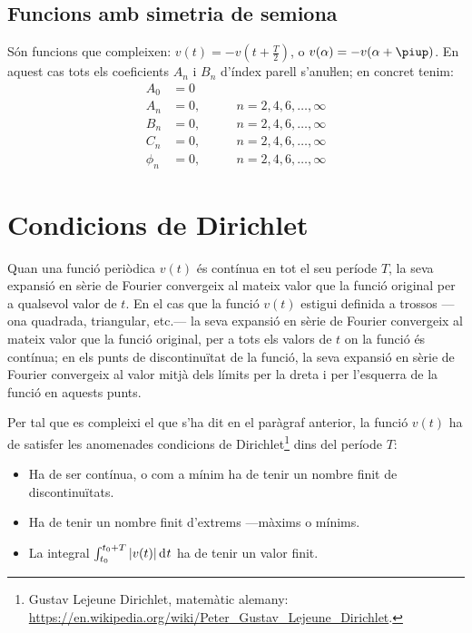 \subsection{Funcions amb simetria de semiona}

Són funcions que compleixen: $v(t) = -v(t+\frac{T}{2})$, o $v(\alpha) = -v(\alpha+\piup)$. En aquest
cas tots els coeficients $A_n$ i $B_n$ d'índex parell s'anuŀlen;
en concret tenim:
\begin{subequations}
\begin{alignat}{2}
    A_0 &= 0       & \\[0.5ex]
    A_n &= 0,       &\qquad n = 2,4,6,\ldots,\infty\\[0.5ex]
    B_n &= 0,      &\qquad n = 2,4,6,\ldots,\infty\\[0.5ex]
    C_n &= 0,       &\qquad n = 2,4,6,\ldots,\infty\\[0.5ex]
    \phi_n &= 0, &\qquad n = 2,4,6,\ldots,\infty
\end{alignat}
\end{subequations}

\section{Condicions de Dirichlet}\label{sec:dirichlet}

Quan una funció periòdica $v(t)$  és contínua en tot el seu període
$T$, la seva expansió en sèrie de Fourier convergeix al mateix valor
que la funció original per a qualsevol valor de $t$.
En el cas que la funció $v(t)$ estigui definida a trossos ---ona quadrada, triangular, etc.--- la seva expansió en sèrie de Fourier convergeix al mateix valor que
la funció original, per a tots els valors de $t$ on la funció és
contínua;  en els punts de discontinuïtat de la funció, la seva
expansió en sèrie de Fourier convergeix al valor mitjà dels límits
per la dreta i per l'esquerra de la funció en aquests punts. 

Per tal que es compleixi el que s'ha dit en el paràgraf anterior, la funció $v(t)$ ha de satisfer les anomenades
condicions de Dirichlet\footnote{Gustav Lejeune Dirichlet, matemàtic alemany: \href{https://en.wikipedia.org/wiki/Peter_Gustav_Lejeune_Dirichlet}{https:/\!\!/en.wikipedia.org/wiki/Peter\_Gustav\_Lejeune\_Dirichlet}.} dins del període $T$:
\begin{itemize}
   \item Ha de ser contínua, o com a mínim ha de tenir un nombre finit de discontinuïtats.
   \item Ha de tenir un nombre finit d'extrems ---màxims o mínims.
   \item La integral $\int_{t_0}^{t_0+T} |v(t)| \diff t$ ha de tenir un valor finit.
\end{itemize}

